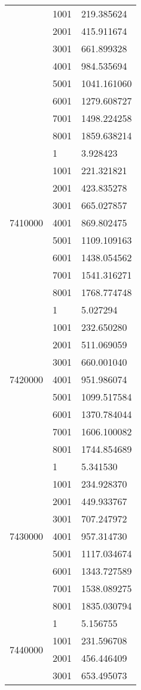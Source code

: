 \begin{table}[htb!]
\begin{tabular}{lll}
 & 1001 & 219.385624 \\
 & 2001 & 415.911674 \\
 & 3001 & 661.899328 \\
 & 4001 & 984.535694 \\
 & 5001 & 1041.161060 \\
 & 6001 & 1279.608727 \\
 & 7001 & 1498.224258 \\
 & 8001 & 1859.638214 \\
\multirow[c]{9}{*}{7410000} & 1 & 3.928423 \\
 & 1001 & 221.321821 \\
 & 2001 & 423.835278 \\
 & 3001 & 665.027857 \\
 & 4001 & 869.802475 \\
 & 5001 & 1109.109163 \\
 & 6001 & 1438.054562 \\
 & 7001 & 1541.316271 \\
 & 8001 & 1768.774748 \\
\multirow[c]{9}{*}{7420000} & 1 & 5.027294 \\
 & 1001 & 232.650280 \\
 & 2001 & 511.069059 \\
 & 3001 & 660.001040 \\
 & 4001 & 951.986074 \\
 & 5001 & 1099.517584 \\
 & 6001 & 1370.784044 \\
 & 7001 & 1606.100082 \\
 & 8001 & 1744.854689 \\
\multirow[c]{9}{*}{7430000} & 1 & 5.341530 \\
 & 1001 & 234.928370 \\
 & 2001 & 449.933767 \\
 & 3001 & 707.247972 \\
 & 4001 & 957.314730 \\
 & 5001 & 1117.034674 \\
 & 6001 & 1343.727589 \\
 & 7001 & 1538.089275 \\
 & 8001 & 1835.030794 \\
\multirow[c]{9}{*}{7440000} & 1 & 5.156755 \\
 & 1001 & 231.596708 \\
 & 2001 & 456.446409 \\
 & 3001 & 653.495073 \\

\end{tabular}
\end{table}
